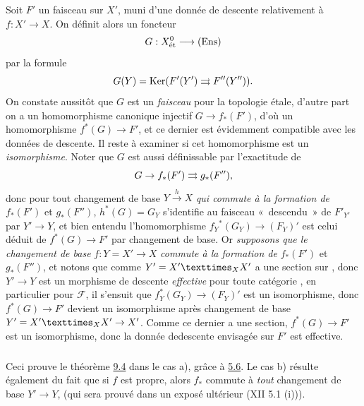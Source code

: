 \documentclass[10pt]{../fichiers-configuration-latex/smfart}
\begin{document}
Soit $F'$ un faisceau sur $X'$, muni d'une donnée de descente
relativement à $f:X'\rightarrow X$. On définit alors un foncteur
$$
G:X^{0}_{\text{\rm ét}}\longrightarrow (\operatorname{Ens})
$$
par la formule
$$
G(Y)=\operatorname{Ker} (F'(Y')\rightrightarrows F''(Y'')){}.
$$
On constate aussitôt que $G$ est un \emph{faisceau} pour la topologie
étale, d'autre part on a un homomorphisme canonique injectif
$G\rightarrow f_{\ast}(F')$, d'où un homomorphisme
$f^{\ast}(G)\rightarrow F'$, et ce dernier est évidemment compatible
avec les données de descente. Il reste à examiner si cet homomorphisme
est un \emph{isomorphisme}. Noter que $G$ est aussi définissable par
l'exactitude de
$$
G\rightarrow f_{\ast}(F')\rightrightarrows g_{\ast}(F''){},
$$
donc pour tout changement de base $Y\xrightarrow{h}X$ \emph{qui
  commute à la formation de} $f_{\ast}(F')$ et $g_{\ast}(F'')$,
$h^{\ast}(G)=G_{Y}$ s'identifie au faisceau « descendu » de
$F'_{Y'}$ par $Y'\rightarrow Y$, et bien entendu l'homomorphisme
$f_{Y}{}^{\ast}(G_{Y})\rightarrow (F_{Y})'$ est celui déduit de
$f^{\ast}(G)\rightarrow F'$ par changement de base. Or \emph{supposons
  que le changement de base} $f:Y=X'\rightarrow X$ \emph{commute à la
  formation de} $f_{\ast}(F')$ et $g_{\ast}(F'')$, et notons que comme
$Y'=\fprod{X'}{X'}{X}$ a une section sur , donc $Y'\rightarrow
Y$ est un morphisme de descente \emph{effective} pour toute catégorie
, en particulier pour $\mathcal{F}$, il s'ensuit que
$f^{\ast}_{Y}(G_{Y})\rightarrow (F_{Y})'$ est un isomorphisme, donc
$f^{\ast}(G)\rightarrow F'$ devient un isomorphisme après changement
de base $Y'=\fprod{X'}{X'}{X}\rightarrow X'$. Comme ce dernier a une
section, $f^{\ast}(G)\rightarrow F'$ est un isomorphisme, donc la
donnée de\pageoriginale  descente envisagée sur $F'$ est effective.

\subsubsection{}

Ceci prouve le théorème \hyperref[VIII.thm9.4]{9.4} dans le cas a), grâce à \hyperref[VIII.cor5.6]{5.6}. Le cas b)
résulte également du fait que si $f$ est propre, alors $f_{\ast}$
commute à \emph{tout} changement de base $Y'\rightarrow Y$, (qui sera
prouvé dans un exposé ultérieur (XII 5.1 (i))).
\end{document}
